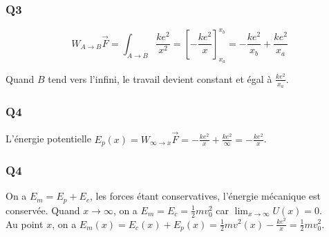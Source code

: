 \documentclass[]{book}
\theoremstyle{definition}
\begin{document}
\subsubsection{Q3}
$$W_{A \to B}\overrightarrow{F} = \int_{A \to B} \frac{ke^2}{x^2} = [-\frac{ke^2}{x}]_{x_a}^{x_b} = -\frac{ke^2}{x_b} + \frac{ke^2}{x_a}$$

Quand $B$ tend vers l'infini, le travail devient constant et \'egal \`a $\frac{ke^2}{x_a}$.

\subsubsection{Q4}
L'\'energie potentielle $E_p(x) = W_{\infty \to x}\overrightarrow{F} = -\frac{ke^2}{x} + \frac{ke^2}{\infty} = -\frac{ke^2}{x}$.\\

\subsubsection{Q4}
On a $E_m = E_p + E_c$, les forces \'etant conservatives, l'\'energie m\'ecanique est conserv\'ee. Quand $x \to \infty$, on a $E_m = E_c = \frac{1}{2}mv_0^2$ car $\lim_{x \to \infty}U(x) = 0$.\\
Au point $x$, on a $E_m(x) = E_c(x) + E_p(x) = \frac{1}{2}mv^2(x) - \frac{ke^2}{x} = \frac{1}{2}mv_0^2$. 
 
\end{document}
